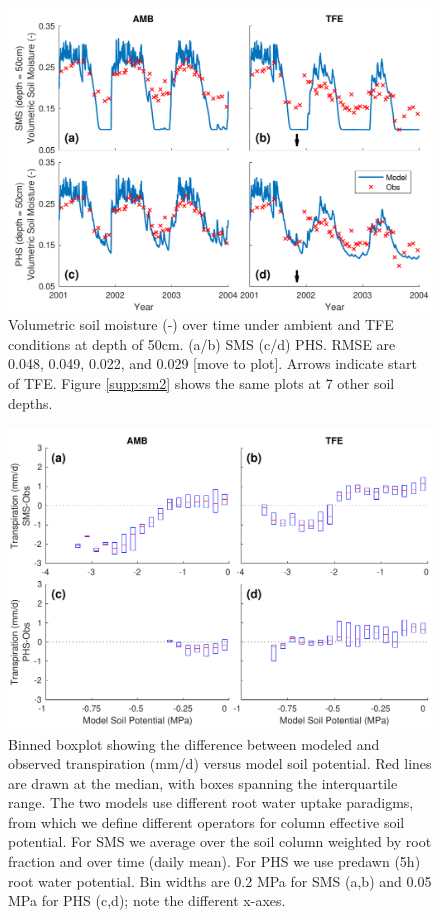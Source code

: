 \documentclass[draft,linenumbers]{agujournal}
\begin{document}
        \clearpage
    \begin{figure}[h]
     \centering
     \includegraphics[width=30pc]{../figs3/sm2.pdf}
     \caption{Volumetric soil moisture (-) over time under ambient and TFE conditions at depth of 50cm.
     (a/b) SMS
     (c/d) PHS.
     RMSE are 0.048, 0.049, 0.022, and 0.029 [move to plot].
     Arrows indicate start of TFE. Figure \ref{supp:sm2} shows the same plots at 7 other soil depths. }
     \label{fig:sm2}
  \end{figure}

              \begin{figure}[h]
     \centering
     \includegraphics[width=30pc]{../figs3/sm3.pdf}
     \caption{Binned boxplot showing the difference between modeled and observed transpiration (mm/d) versus model soil potential.
     Red lines are drawn at the median, with boxes spanning the interquartile range.
     The two models use different root water uptake paradigms, from which we define different operators for column effective soil potential.
     For SMS we average over the soil column weighted by root fraction and over time (daily mean).
     For PHS we use predawn (5h) root water potential.
     Bin widths are 0.2 MPa for SMS (a,b) and 0.05 MPa for PHS (c,d); note the different x-axes. 
}
     \label{fig:cool}
  \end{figure}
          \clearpage
\end{document}
